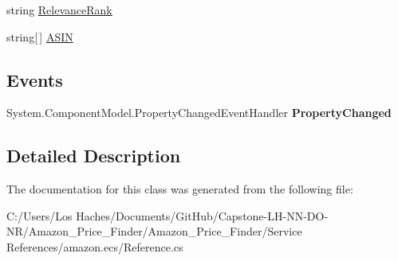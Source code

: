 \begin{DoxyCompactItemize}
\begin{DoxyCompactList}\small\item\em \end{DoxyCompactList}\item 
\hypertarget{class_amazon___price___finder_1_1amazon_1_1ecs_1_1_search_results_map_search_index_aa2ddd81b6d2c1a08a96def121f8b5d00}{string \hyperlink{class_amazon___price___finder_1_1amazon_1_1ecs_1_1_search_results_map_search_index_aa2ddd81b6d2c1a08a96def121f8b5d00}{Relevance\-Rank}}\label{class_amazon___price___finder_1_1amazon_1_1ecs_1_1_search_results_map_search_index_aa2ddd81b6d2c1a08a96def121f8b5d00}

\begin{DoxyCompactList}\small\item\em \end{DoxyCompactList}\item 
\hypertarget{class_amazon___price___finder_1_1amazon_1_1ecs_1_1_search_results_map_search_index_a09769c6db54520a44252b58d60fd829f}{string\mbox{[}$\,$\mbox{]} \hyperlink{class_amazon___price___finder_1_1amazon_1_1ecs_1_1_search_results_map_search_index_a09769c6db54520a44252b58d60fd829f}{A\-S\-I\-N}}\label{class_amazon___price___finder_1_1amazon_1_1ecs_1_1_search_results_map_search_index_a09769c6db54520a44252b58d60fd829f}

\begin{DoxyCompactList}\small\item\em \end{DoxyCompactList}\end{DoxyCompactItemize}
\subsection*{Events}
\begin{DoxyCompactItemize}
\item 
\hypertarget{class_amazon___price___finder_1_1amazon_1_1ecs_1_1_search_results_map_search_index_a034fa7994fd64c6d0d5fd9e2f1ed530f}{System.\-Component\-Model.\-Property\-Changed\-Event\-Handler {\bfseries Property\-Changed}}\label{class_amazon___price___finder_1_1amazon_1_1ecs_1_1_search_results_map_search_index_a034fa7994fd64c6d0d5fd9e2f1ed530f}

\end{DoxyCompactItemize}


\subsection{Detailed Description}


The documentation for this class was generated from the following file\-:\begin{DoxyCompactItemize}
\item 
C\-:/\-Users/\-Los Haches/\-Documents/\-Git\-Hub/\-Capstone-\/\-L\-H-\/\-N\-N-\/\-D\-O-\/\-N\-R/\-Amazon\-\_\-\-Price\-\_\-\-Finder/\-Amazon\-\_\-\-Price\-\_\-\-Finder/\-Service References/amazon.\-ecs/Reference.\-cs\end{DoxyCompactItemize}
